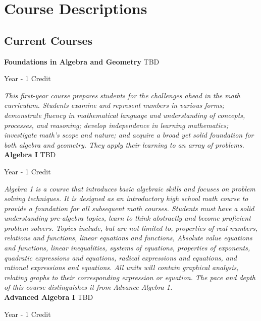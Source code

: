 \section{Course Descriptions}

\subsection{Current Courses}
\noindent\textbf{Foundations in Algebra and Geometry} \hfill TBD

\noindent Year - 1 Credit

\vspace{1mm}\emph{This first-year course prepares students for the challenges ahead in the math curriculum. Students examine and represent numbers in various forms; demonstrate fluency in mathematical language and understanding of concepts, processes, and reasoning; develop independence in learning mathematics; investigate math's scope and nature; and acquire a broad yet solid foundation for both algebra and geometry. They apply their learning to an array of problems.}\\

\noindent\textbf{Algebra I} \hfill TBD

\noindent Year - 1 Credit

\vspace{1mm}\emph{Algebra 1 is a course that introduces basic algebraic skills and focuses on problem solving techniques. It is designed as an introductory high school math course to provide a foundation for all subsequent math courses. Students must have a solid understanding pre-algebra topics, learn to think abstractly and become proficient problem solvers. Topics include, but are not limited to, properties of real numbers, relations and functions, linear equations and functions, Absolute value equations and functions, linear inequalities, systems of equations, properties of exponents, quadratic expressions and equations, radical expressions and equations, and rational expressions and equations. All units will contain graphical analysis, relating graphs to their corresponding expression or equation. The pace and depth of this course distinguishes it from Advance Algebra 1.}\\

\noindent\textbf{Advanced Algebra I} \hfill TBD

\noindent Year - 1 Credit

